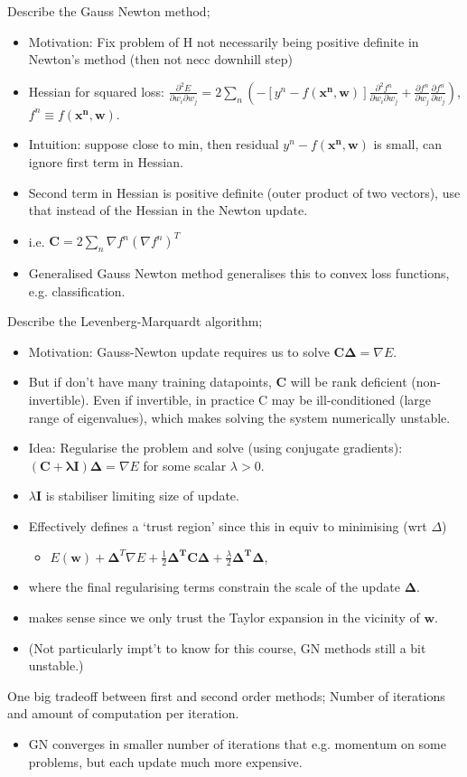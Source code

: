 \documentclass{article}
\begin{document}
Describe the Gauss Newton method; \begin{itemize} \item Motivation: Fix problem of H not necessarily being positive definite in Newton's method (then not necc downhill step) \item Hessian for squared loss: $\frac{\partial^2 E}{\partial w_i \partial w_j}=2\sum_n (-[y^n-f(\mathbf{x^n, w})]\frac{\partial ^2 f^n}{\partial w_i \partial w_j}+\frac{\partial f^n}{\partial w_j}\frac{\partial f^n}{\partial w_j})$, $f^n\equiv f(\mathbf{x^n, w})$.  \item Intuition: suppose close to min, then residual $y^n-f(\mathbf{x^n,w})$ is small, can ignore first term in Hessian.  \item Second term in Hessian is positive definite (outer product of two vectors), use that instead of the Hessian in the Newton update.  \item i.e. $\mathbf{C}=2\sum_n\nabla f^n(\nabla f^n)^T$ \item Generalised Gauss Newton method generalises this to convex loss functions, e.g. classification.  \end{itemize} 
            
Describe the Levenberg-Marquardt algorithm; \begin{itemize} \item Motivation: Gauss-Newton update requires us to solve $\mathbf{C\Delta} = \nabla E$.  \item But if don't have many training datapoints, $\mathbf{C}$ will be rank deficient (non-invertible). Even if invertible, in practice C may be ill-conditioned (large range of eigenvalues), which makes solving the system numerically unstable.  \item Idea: Regularise the problem and solve (using conjugate gradients): $(\mathbf{C+\lambda I})\mathbf{\Delta}=\nabla E$ for some scalar $\lambda > 0$.  \item $\lambda \mathbf{I}$ is stabiliser limiting size of update.  \item Effectively defines a `trust region' since this in equiv to minimising (wrt $\Delta$) \begin{itemize} \item $E(\mathbf{w}) + \mathbf{\Delta}^T\nabla E + \frac{1}{2}\mathbf{\Delta^TC\Delta} + \frac{\lambda}{2}\mathbf{\Delta^T\Delta}$, \end{itemize} \item where the final regularising terms constrain the scale of the update $\mathbf{\Delta}$.  \item makes sense since we only trust the Taylor expansion in the vicinity of $\mathbf{w}$.  \item (Not particularly impt't to know for this course, GN methods still a bit unstable.) \end{itemize}

One big tradeoff between first and second order methods; Number of iterations and amount of computation per iteration. \begin{itemize} \item GN converges in smaller number of iterations that e.g. momentum on some problems, but each update much more expensive.  \end{itemize}
\end{document}
